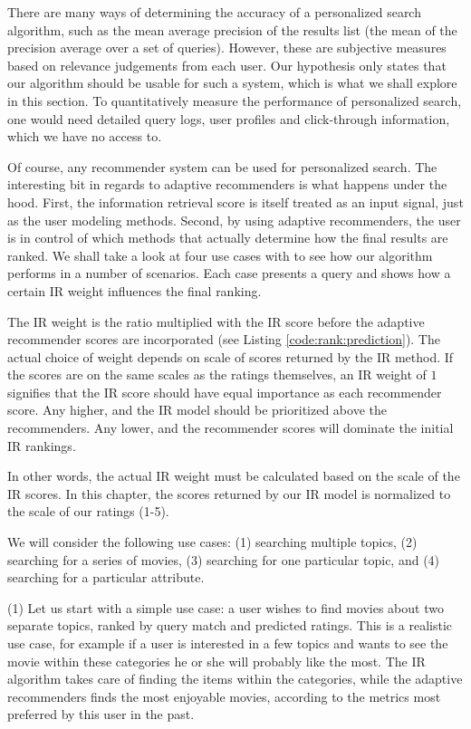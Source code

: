 There are many ways of determining the accuracy of a personalized search
algorithm, such as the mean average precision of the results list
(the mean of the precision average over a set of queries).
However, these are subjective measures based on relevance judgements from each user.
Our hypothesis only states that our algorithm should be usable for such 
a system, which is what we shall explore in this section.
To quantitatively measure the performance of personalized search,
one would need detailed query logs, user profiles and click-through information,
which we have no access to.

Of course, any recommender system can be used for personalized search.
The interesting bit in regards to adaptive recommenders is what 
happens under the hood. First, the information retrieval score 
is itself treated as an input signal, just as the user modeling methods.
Second, by using adaptive recommenders, the user is in control of which
methods that actually determine how the final results are ranked.
We shall take a look at four use cases with to see how our algorithm
performs in a number of scenarios. Each case presents 
a query and shows how a certain IR weight influences the final ranking.

The IR weight is the ratio multiplied with the IR score 
before the adaptive recommender scores are incorporated
(see Listing \ref{code:rank:prediction}).
The actual choice of weight depends on scale of scores
returned by the IR method.
If the scores are on the same scales as the ratings themselves,
an IR weight of $1$ signifies that the IR score
should have equal importance as each recommender score.
Any higher, and the IR model should be prioritized above the recommenders.
Any lower, and the recommender scores will dominate the initial IR rankings.

In other words, the actual IR weight must
be calculated based on the scale of the IR scores.
In this chapter, the scores returned by our IR
model is normalized to the scale of our ratings (1-5).

We will consider the following use cases:
(1) searching multiple topics,
(2) searching for a series of movies,
(3) searching for one particular topic, and
(4) searching for a particular attribute.


\afterpage{\clearpage}

(1) Let us start with a simple use case:
a user wishes to find movies about two separate topics, ranked by 
query match and predicted ratings.
This is a realistic use case, for example if a user is interested
in a few topics and wants to see the movie within these categories
he or she will probably like the most.
The IR algorithm takes care of finding the items within the categories,
while the adaptive recommenders finds the most enjoyable movies,
according to the metrics most preferred by this user in the past.

